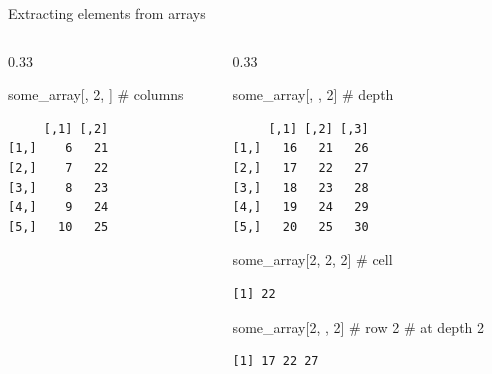 \documentclass[
  ignorenonframetext,
  aspectratio=169,
]{beamer}
\newenvironment{Shaded}{\begin{snugshade}}{\end{snugshade}}
\newcommand{\CommentTok}[1]{\textcolor[rgb]{0.37,0.37,0.37}{#1}}
\newcommand{\DecValTok}[1]{\textcolor[rgb]{0.68,0.00,0.00}{#1}}
\newcommand{\NormalTok}[1]{\textcolor[rgb]{0.00,0.23,0.31}{#1}}
\begin{document}
\begin{frame}[fragile]{Extracting elements from arrays}
\begin{columns}[T]
\begin{column}{0.33\linewidth}
\normalsize
\vspace{1em}

\scriptsize

\begin{Shaded}
\begin{Highlighting}[]
\NormalTok{some\_array[, }\DecValTok{2}\NormalTok{, ] }\CommentTok{\# columns}
\end{Highlighting}
\end{Shaded}

\begin{verbatim}
     [,1] [,2]
[1,]    6   21
[2,]    7   22
[3,]    8   23
[4,]    9   24
[5,]   10   25
\end{verbatim}

\normalsize
\end{column}

\begin{column}{0.33\linewidth}
\scriptsize

\begin{Shaded}
\begin{Highlighting}[]
\NormalTok{some\_array[, , }\DecValTok{2}\NormalTok{] }\CommentTok{\# depth}
\end{Highlighting}
\end{Shaded}

\begin{verbatim}
     [,1] [,2] [,3]
[1,]   16   21   26
[2,]   17   22   27
[3,]   18   23   28
[4,]   19   24   29
[5,]   20   25   30
\end{verbatim}

\normalsize
\vspace{1em}

\scriptsize

\begin{Shaded}
\begin{Highlighting}[]
\NormalTok{some\_array[}\DecValTok{2}\NormalTok{, }\DecValTok{2}\NormalTok{, }\DecValTok{2}\NormalTok{] }\CommentTok{\# cell}
\end{Highlighting}
\end{Shaded}

\begin{verbatim}
[1] 22
\end{verbatim}

\normalsize
\vspace{1em}

\scriptsize

\begin{Shaded}
\begin{Highlighting}[]
\NormalTok{some\_array[}\DecValTok{2}\NormalTok{, , }\DecValTok{2}\NormalTok{] }\CommentTok{\# row 2}
                   \CommentTok{\# at depth 2}
\end{Highlighting}
\end{Shaded}

\begin{verbatim}
[1] 17 22 27
\end{verbatim}

\normalsize
\end{column}
\end{columns}
\end{frame}
\end{document}
